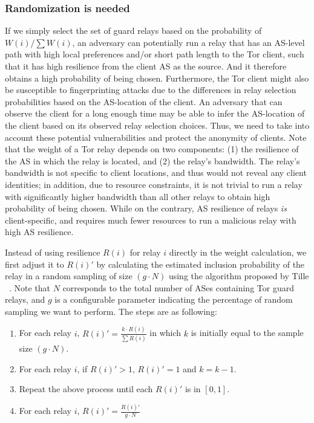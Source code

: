 \subsubsection{Randomization is needed}
\label{relay_randomization}
If we simply select the set of guard relays based on the probability of $W(i)/\sum W(i)$, an adversary can potentially run a relay that has an AS-level path with high local preferences and/or short path length to the Tor client, such that it has high resilience from the client AS as the source. And it therefore obtains a high probability of being chosen. Furthermore, the Tor client might also be susceptible to fingerprinting attacks due to the differences in relay selection probabilities based on the AS-location of the client. An adversary that can observe the client for a long enough time may be able to infer the AS-location of the client based on its observed relay selection choices. Thus, we need to take into account these potential vulnerabilities and protect the anonymity of clients. Note that the weight of a Tor relay depends on two components: (1) the resilience of the AS in which the relay is located, and (2) the relay's bandwidth. The relay's bandwidth is not specific to client locations, and thus would not reveal any client identities; in addition, due to resource constraints, it is not trivial to run a relay with significantly higher bandwidth than all other relays to obtain high probability of being chosen. While on the contrary, AS resilience of relays \emph{is} client-specific, and requires much fewer resources to run a malicious relay with high AS resilience.

Instead of using resilience $R(i)$ for relay $i$ directly in the weight calculation, we first adjust it to $R(i)\prime$ by calculating the estimated inclusion probability of the relay in a random sampling of size $(g \cdot N)$ using the algorithm proposed by Tille ~\cite{tille1996elimination}. Note that $N$ corresponds to the total number of ASes containing Tor guard relays, and $g$ is a configurable parameter indicating the percentage of random sampling we want to perform. The steps are as following:
\begin{enumerate}
\item For each relay $i$, $R(i)\prime = \frac {k \cdot R(i)} {\sum R(i)}$ in which $k$ is initially equal to the sample size $(g \cdot N)$.
\item For each relay $i$, if $R(i)\prime > 1$, $R(i)\prime = 1$ and $k = k - 1$.
\item Repeat the above process until each $R(i)\prime$ is in $[0,1]$.
\item For each relay $i$, $R(i)\prime = \frac{R(i)\prime} {g \cdot N}$
\end{enumerate}


